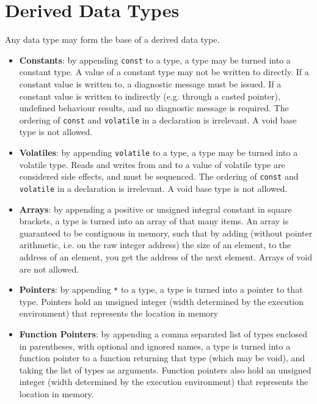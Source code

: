 \documentclass[letterpaper,12pt]{book}
\begin{document}
\section{Derived Data Types}

Any data type may form the base of a derived data type.

\begin{itemize}
	\item \textbf{Constants}: by appending \texttt{const} to a type, a type may be turned into a constant type. A value of a constant type may not be written to directly. If a constant value is written to, a diagnostic message must be issued. If a constant value is written to indirectly (e.g. through a casted pointer), undefined behaviour results, and no diagnostic message is required. The ordering of \texttt{const} and \texttt{volatile} in a declaration is irrelevant. A void base type is not allowed.
	
	\item \textbf{Volatiles}: by appending \texttt{volatile} to a type, a type may be turned into a volatile type. Reads and writes from and to a value of volatile type are considered side effects, and must be sequenced. The ordering of \texttt{const} and \texttt{volatile} in a declaration is irrelevant. A void base type is not allowed.
	
	\item \textbf{Arrays}: by appending a positive or unsigned integral constant in square brackets, a type is turned into an array of that many items. An array is guaranteed to be contiguous in memory, such that by adding (without pointer arithmetic, i.e. on the raw integer address) the size of an element, to the address of an element, you get the address of the next element. Arrays of void are not allowed.
	
	\item \textbf{Pointers}: by appending \texttt{*} to a type, a type is turned into a pointer to that type. Pointers hold an unsigned integer (width determined by the execution environment) that represents the location in memory 
	
	\item \textbf{Function Pointers}: by appending a comma separated list of types enclosed in parentheses, with optional and ignored names, a type is turned into a function pointer to a function returning that type (which may be void), and taking the list of types as arguments. Function pointers also hold an unsigned integer (width determined by the execution environment) that represents the location in memory.
\end{itemize}
\end{document}
